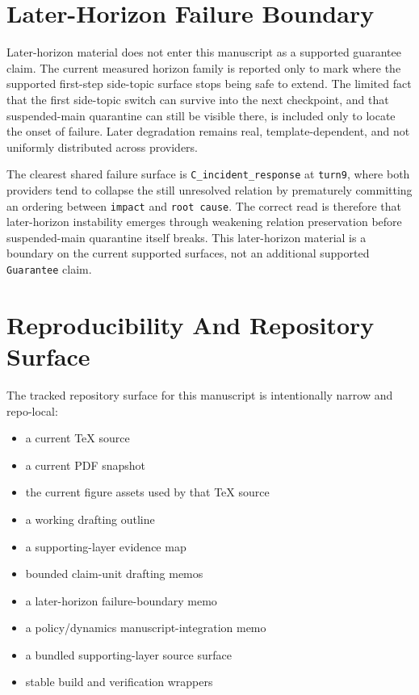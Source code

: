 \documentclass[11pt]{article}
\begin{document}
\section{Later-Horizon Failure Boundary}

Later-horizon material does not enter this manuscript as a supported guarantee
claim. The current measured horizon family is reported only to mark where the
supported first-step side-topic surface stops being safe to extend. The limited
fact that the first side-topic switch can survive into the next checkpoint, and
that suspended-main quarantine can still be visible there, is included only to
locate the onset of failure. Later degradation remains real, template-dependent,
and not uniformly distributed across providers.

The clearest shared failure surface is \texttt{C\_incident\_response} at
\texttt{turn9}, where both providers tend to collapse the still unresolved
relation by prematurely committing an ordering between \texttt{impact} and
\texttt{root cause}. The correct read is therefore that later-horizon
instability emerges through weakening relation preservation before
suspended-main quarantine itself breaks. This later-horizon material is a
boundary on the current supported surfaces, not an additional supported
\texttt{Guarantee} claim.

\section{Reproducibility And Repository Surface}

The tracked repository surface for this manuscript is intentionally narrow and
repo-local:
\begin{itemize}
\item a current TeX source
\item a current PDF snapshot
\item the current figure assets used by that TeX source
\item a working drafting outline
\item a supporting-layer evidence map
\item bounded claim-unit drafting memos
\item a later-horizon failure-boundary memo
\item a policy/dynamics manuscript-integration memo
\item a bundled supporting-layer source surface
\item stable build and verification wrappers
\end{itemize}
\end{document}
